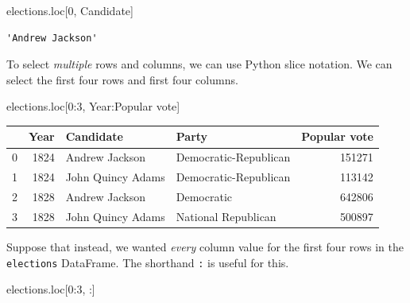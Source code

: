 \documentclass[
  letterpaper,
  DIV=11,
  numbers=noendperiod]{scrreprt}
\newenvironment{Shaded}{\begin{snugshade}}{\end{snugshade}}
\newcommand{\DecValTok}[1]{\textcolor[rgb]{0.68,0.00,0.00}{#1}}
\newcommand{\NormalTok}[1]{\textcolor[rgb]{0.00,0.23,0.31}{#1}}
\newcommand{\StringTok}[1]{\textcolor[rgb]{0.13,0.47,0.30}{#1}}
\begin{document}
\begin{Shaded}
\begin{Highlighting}[]
\NormalTok{elections.loc[}\DecValTok{0}\NormalTok{, }\StringTok{\textquotesingle{}Candidate\textquotesingle{}}\NormalTok{]}
\end{Highlighting}
\end{Shaded}

\begin{verbatim}
'Andrew Jackson'
\end{verbatim}

To select \emph{multiple} rows and columns, we can use Python slice
notation. We can select the first four rows and first four columns.

\begin{Shaded}
\begin{Highlighting}[]
\NormalTok{elections.loc[}\DecValTok{0}\NormalTok{:}\DecValTok{3}\NormalTok{, }\StringTok{\textquotesingle{}Year\textquotesingle{}}\NormalTok{:}\StringTok{\textquotesingle{}Popular vote\textquotesingle{}}\NormalTok{]}
\end{Highlighting}
\end{Shaded}

\begin{tabular}{lrllr}
\toprule
{} &  Year &          Candidate &                  Party &  Popular vote \\
\midrule
0 &  1824 &     Andrew Jackson &  Democratic-Republican &        151271 \\
1 &  1824 &  John Quincy Adams &  Democratic-Republican &        113142 \\
2 &  1828 &     Andrew Jackson &             Democratic &        642806 \\
3 &  1828 &  John Quincy Adams &    National Republican &        500897 \\
\bottomrule
\end{tabular}

Suppose that instead, we wanted \emph{every} column value for the first
four rows in the \texttt{elections} DataFrame. The shorthand \texttt{:}
is useful for this.

\begin{Shaded}
\begin{Highlighting}[]
\NormalTok{elections.loc[}\DecValTok{0}\NormalTok{:}\DecValTok{3}\NormalTok{, :]}
\end{Highlighting}
\end{Shaded}
\end{document}
